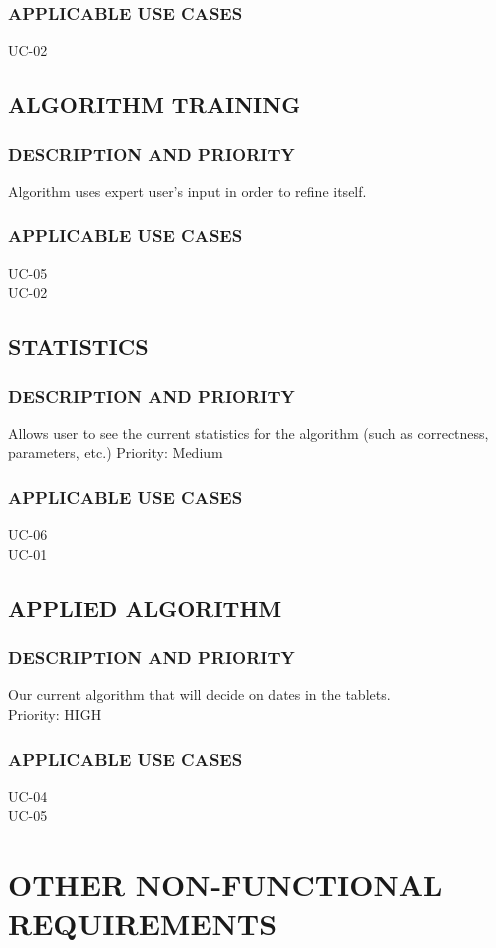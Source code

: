 \documentclass[11pt]{article}
\begin{document}
\subsubsection{APPLICABLE USE CASES}
UC-02

\subsection{ALGORITHM TRAINING}
\subsubsection{DESCRIPTION AND PRIORITY}
Algorithm uses expert user’s input in order to refine itself. 
\subsubsection{APPLICABLE USE CASES}
UC-05\\
UC-02

\subsection{STATISTICS}
\subsubsection{DESCRIPTION AND PRIORITY}
Allows user to see the current statistics for the algorithm (such as correctness, parameters, etc.)
Priority: Medium
\subsubsection{APPLICABLE USE CASES}
UC-06\\
UC-01

\subsection{APPLIED ALGORITHM}
\subsubsection{DESCRIPTION AND PRIORITY}
Our current algorithm that will decide on dates in the tablets.\\
Priority: HIGH
\subsubsection{APPLICABLE USE CASES}
UC-04\\
UC-05

\section{OTHER NON-FUNCTIONAL REQUIREMENTS}
\end{document}
